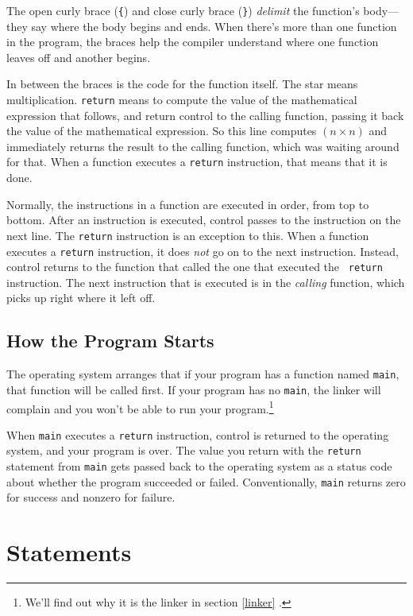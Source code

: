 The open curly brace ({\tt\{}) and close curly brace ({\tt\}}) {\em
delimit}\/ the function's body---they say where the body begins and
ends.  When there's more than one function in the program, the braces help
the compiler understand where one function leaves off and another
begins.

In between the braces is the code for the function itself.  The star
{\tt *} means multiplication.  {\tt return} means to compute the value
of the mathematical expression that follows, and return control to the
calling function, passing it back the value of the mathematical
expression.  So this line computes $(n\times n)$ and immediately returns
the result to the calling function, which was waiting around for that.
When a function executes a {\tt return} instruction, that means that it
is done.

Normally, the instructions in a function are executed in order, from top
to bottom.  After an instruction is executed, control passes to the
instruction on the next line.  The {\tt return} instruction is an
exception to this.  When a function executes a {\tt return} instruction,
it does {\em not}\/ go on to the next instruction.  Instead, control
returns to the function that called the one that executed the {\tt
return} instruction.  The next instruction that is executed is in the
{\em calling} function, which picks up right where it left off.

\subsection{How the Program Starts}

The operating system arranges that if your program has a function named
{\tt main}, that function will be called first.  If your program has no
{\tt main}, the linker will complain and you won't be able to run your
program.\footnote{We'll find out why it is the linker in section
\ref{linker} .}

When {\tt main} executes a {\tt return} instruction, control is returned
to the operating system, and your program is over.  The value you return
with the {\tt return } statement from {\tt main} gets passed back to the
operating system as a status code about whether the program succeeded or
failed. Conventionally, {\tt main} returns zero for success and nonzero
for failure.

\section{Statements}

